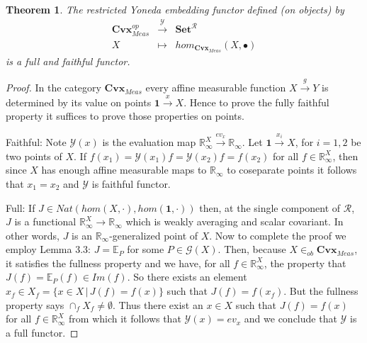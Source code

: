 \documentclass[11pt]{amsart}    %
\newtheorem{theorem}{Theorem}
\newcommand{\G}{\mathcal{G}}
\begin{document}
\begin{theorem} 
The restricted Yoneda embedding functor defined (on objects) by
\begin{equation}
\begin{array}{ccc}
\mathbf{Cvx}_{Meas}^{op} & \xrightarrow{\mathcal{Y}} & \mathbf{Set}^{\mathcal{R}} \\
X & \mapsto & hom_{\mathbf{Cvx}_{Meas}}(X, \bullet)
\end{array}
\end{equation}
is a full and faithful functor. 
\end{theorem}
\begin{proof} 
In the category $\mathbf{Cvx}_{Meas}$ every affine measurable function $X \xrightarrow{g} Y$ is determined by its value on points $\mathbf{1} \xrightarrow{x} X$. Hence to prove the fully faithful property it suffices to prove those properties on points.

Faithful:  Note $\mathcal{Y}(x)$ is the evaluation map
$\mathbb{R}_{\infty}^X \xrightarrow{ev_x} \mathbb{R}_{\infty}$.  Let $\mathbf{1} \xrightarrow{x_i} X$, for $i=1,2$ be two points of $X$. If $f(x_1) = \mathcal{Y}(x_1)f = \mathcal{Y}(x_2)f = f(x_2)$ for all $f \in \mathbb{R}_{\infty}^X$, then since $X$ has enough affine measurable maps to $\mathbb{R}_{\infty}$ to coseparate points it follows that $x_1=x_2$ and $\mathcal{Y}$ is faithful functor.  

Full:  If $J \in Nat( hom(X, \cdot), hom(\mathbf{1}, \cdot) )$  then, at the single component of $\mathcal{R}$, $J$ is a  functional  $\mathbb{R}_{\infty}^X \rightarrow \mathbb{R}_{\infty}$ which is weakly averaging and scalar covariant. In other words,  $J$ is an $\mathbb{R}_{\infty}$-generalized point of $X$.   Now to complete the proof we employ Lemma 3.3:  $J = \mathbb{E}_P$ for some  $P \in \G(X)$.  Then, because $X \in_{ob} \mathbf{Cvx}_{Meas}$, it satisfies the fullness property and we have, for all $f \in \mathbb{R}_{\infty}^X$, the property that $J(f) = \mathbb{E}_P(f) \in Im(f)$.  So there exists an element $x_f \in X_f = \{x \in X \, | \, J(f) = f(x) \}$ such that $J(f)=f(x_f)$. But the fullness property says $\cap_f X_f \ne \emptyset$.  Thus there exist an $x \in X$ such that $J(f) = f(x)$ for all $f \in \mathbb{R}_{\infty}^X$ from which it follows that $\mathcal{Y}(x) = ev_x$ and we conclude that $\mathcal{Y}$ is a full functor.
\end{proof}
\end{document}
